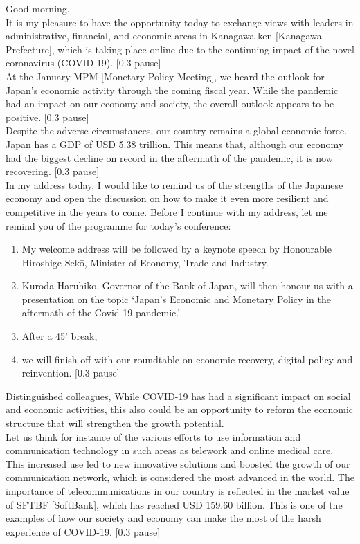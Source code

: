 \noindent Good morning. \\
It is my pleasure to have the opportunity today to exchange views with leaders in administrative, financial, and economic areas in Kanagawa-ken [Kanagawa Prefecture], which is taking place online due to the continuing impact of the novel coronavirus (COVID-19). [0.3 pause] \\

At the January MPM [Monetary Policy Meeting], we heard the outlook for Japan's economic activity through the coming fiscal year. While the pandemic had an impact on our economy and society, the overall outlook appears to be positive. [0.3 pause] \\

Despite the adverse circumstances, our country remains a global economic force. Japan has a GDP of USD 5.38 trillion. This means that, although our economy had the biggest decline on record in the aftermath of the pandemic, it is now recovering. [0.3 pause]\\

In my address today, I would like to remind us of the strengths of the Japanese economy and open the discussion on how to make it even more resilient and competitive in the years to come. Before I continue with my address, let me remind you of the programme for today’s conference:
\begin{enumerate}
    \item My welcome address will be followed by a keynote speech by Honourable Hiroshige Sekō, Minister of Economy, Trade and Industry. 
    \item Kuroda Haruhiko, Governor of the Bank of Japan, will then honour us with a presentation on the topic ‘Japan’s Economic and Monetary Policy in the aftermath of the Covid-19 pandemic.’ 
    \item After a 45’ break, 
    \item we will finish off with our roundtable on economic recovery, digital policy and reinvention. [0.3 pause] 
\end{enumerate}

Distinguished colleagues, While COVID-19 has had a significant impact on social and economic activities, this also could be an opportunity to reform the economic structure that will strengthen the growth potential. \\
Let us think for instance of the various efforts to use information and communication technology in such areas as telework and online medical care. This increased use led to new innovative solutions and boosted the growth of our communication network, which is considered the most advanced in the world. The importance of telecommunications in our country is reflected in the market value of SFTBF [SoftBank], which has reached USD 159.60 billion. This is one of the examples of how our society and economy can make the most of the harsh experience of COVID-19. [0.3 pause] \\

